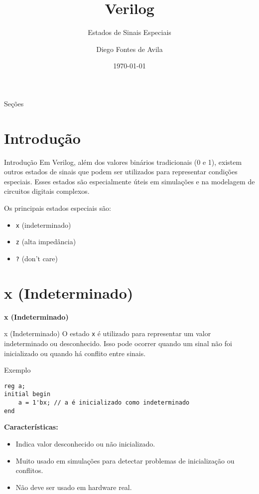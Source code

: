 \documentclass[aspectratio=169,xcolor=dvipsnames]{beamer}
\title{Verilog}
\subtitle{Estados de Sinais Especiais}
\author{Diego Fontes de Avila}
\institute
{
    Poliware \\
    Escola Politécnica da Universidade de São Paulo
}
\date{\today}
\begin{document}
\begin{frame}
    \titlepage
\end{frame}

\begin{frame}{Seções}
    \tableofcontents
\end{frame}

\section{Introdução}

\begin{frame}{Introdução}
    Em Verilog, além dos valores binários tradicionais (0 e 1), existem outros estados de sinais que podem ser utilizados para representar condições especiais. Esses estados são especialmente úteis em simulações e na modelagem de circuitos digitais complexos.

    Os principais estados especiais são:
    \begin{itemize}
        \item \texttt{x} (indeterminado)
        \item \texttt{z} (alta impedância)
        \item \texttt{?} (don't care)
    \end{itemize}
\end{frame}

\section{x (Indeterminado)}

\begin{frame}
    \Huge{\centerline{\textbf{x (Indeterminado)}}}
\end{frame}

\begin{frame}[fragile]{x (Indeterminado)}
O estado \texttt{x} é utilizado para representar um valor indeterminado ou desconhecido. Isso pode ocorrer quando um sinal não foi inicializado ou quando há conflito entre sinais.

\begin{block}{Exemplo}
\begin{verbatim}
reg a;
initial begin
    a = 1'bx; // a é inicializado como indeterminado
end
\end{verbatim}
\end{block}

\textbf{Características:}
\begin{itemize}
    \item Indica valor desconhecido ou não inicializado.
    \item Muito usado em simulações para detectar problemas de inicialização ou conflitos.
    \item Não deve ser usado em hardware real.
\end{itemize}
\end{frame}
\end{document}
